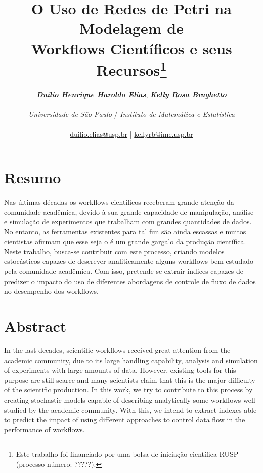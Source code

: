 \documentclass[a4paper,10pt]{article}
\date{}
\title{
    O Uso de Redes de Petri na Modelagem de \\Workflows Científicos e seus Recursos\footnote{Este trabalho foi financiado por uma bolsa de iniciação científica RUSP (processo número: ?????).}
}
\author{
\textbf{\textit{Duílio Henrique Haroldo Elias}},\textbf{ \textit{Kelly Rosa Braghetto}}\\
\\
\textit{Universidade de São Paulo} / \textit{Instituto de Matemática e Estatística}\\
\\
\href{mailto:duilio.elias@usp.br}{duilio.elias@usp.br} | \href{mailto:kellyrb@ime.usp.br}{kellyrb@ime.usp.br}
}
\begin{document}
\maketitle
    
\section*{Resumo}
	Nas últimas décadas os workflows científicos receberam grande atenção da comunidade acadêmica, devido à sua grande
capacidade de manipulação, análise e simulação de experimentos que trabalham com grandes quantidades de dados. No entanto,
as ferramentas existentes para tal fim são ainda escassas e muitos cientistas afirmam que esse seja o é um grande gargalo da produção científica. Neste trabalho, busca-se contribuir com este processo, criando modelos estocásticos capazes de descrever analiticamente alguns workflows bem estudado pela comunidade acadêmica. Com isso, pretende-se extrair índices capazes de predizer o impacto do uso de diferentes abordagens de controle de fluxo de dados no desempenho dos workflows.

\section*{Abstract}

In the last decades, scientific workflows received great attention from the academic community, due to its large handling capability, analysis and simulation of experiments with large amounts of data. However, existing tools for this purpose are still scarce and many scientists claim that this is the major difficulty of the  scientific production. In this work, we try to contribute to this process by creating stochastic models capable of describing analytically some workflows well studied by the academic community. With this, we intend to extract indexes able to predict the impact of using different approaches to control data flow in the performance of workflows.

\thispagestyle{fancy}

\newpage
\end{document}
